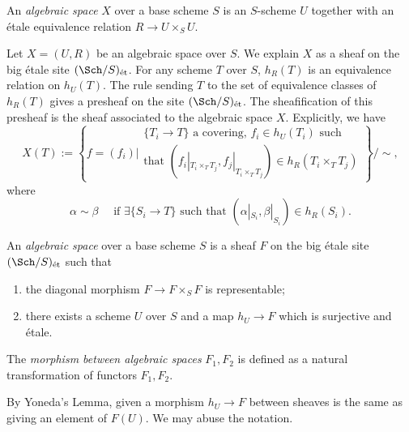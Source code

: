     \begin{definition}\label{def:algebraic_space_as_topological_space}
        An \emph{algebraic space} \(X\) over a base scheme \(S\) is an \(S\)-scheme \(U\) together with an \'etale equivalence relation \(R \to U \times_S U\).
    \end{definition}

    Let \(X = (U,R)\) be an algebraic space over \(S\).
    We explain \(X\) as a sheaf on the big \'etale site \((\Sch/S)_{\text{\'et}}\).
    For any scheme \(T\) over \(S\), \(h_R(T)\) is an equivalence relation on \(h_U(T)\).
    The rule sending \(T\) to the set of equivalence classes of \(h_R(T)\) gives a presheaf on the site \((\Sch/S)_{\text{\'et}}\).
    The sheafification of this presheaf is the sheaf associated to the algebraic space \(X\).
    Explicitly, we have
    \[ X(T) := \left\{ f = (f_i) \Bigg| \begin{array}{c}
        \{T_i\to T\} \text{ a covering, } f_i \in h_U(T_i) \text{ such}  \\
        \text{that } (f_i|_{T_i\times_T T_j},f_j|_{T_i\times_T T_j}) \in h_R(T_i \times_T T_j)
    \end{array}     \right\}\Bigg/ \sim, \]
    where 
    \[ \alpha \sim \beta \quad \text{ if } \exists \{S_i \to T\} \text{ such that } (\alpha|_{S_i},\beta|_{S_i}) \in h_R(S_i). \]

    \begin{definition}\label{def:algebraic_space_as_sheaf}
        An \emph{algebraic space} over a base scheme \(S\) is a sheaf \(F\) on the big \'etale site \((\Sch/S)_{\text{\'et}}\) such that 
        \begin{enumerate}
            \item the diagonal morphism \(F \to F \times_S F\) is representable;
            \item there exists a scheme \(U\) over \(S\) and a map \(h_U \to F\) which is surjective and \'etale.
        \end{enumerate}
        The \emph{morphism between algebraic spaces} \(F_1,F_2\) is defined as a natural transformation of functors \(F_1, F_2\).
    \end{definition}

    \begin{remark}
        By Yoneda's Lemma, given a morphism \(h_U \to F\) between sheaves is the same as giving an element of \(F(U)\).
        We may abuse the notation.
    \end{remark}

